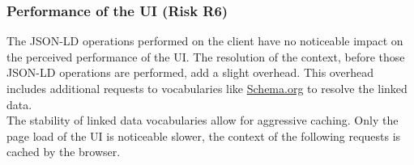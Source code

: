 \subsubsection{Performance of the UI (Risk R6)}
The JSON-LD operations performed on the client have no noticeable impact on the perceived performance of the UI. The resolution of the context, before those JSON-LD operations are performed, add a slight overhead. This overhead includes additional requests to vocabularies like \url{Schema.org} to resolve the linked data. \\
The stability of linked data vocabularies allow for aggressive caching. Only the page load of the UI is noticeable slower, the context of the following requests is cached by the browser.
